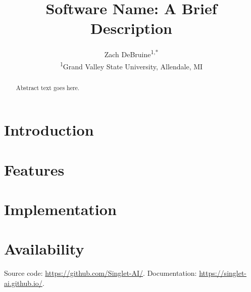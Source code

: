 \documentclass[10pt,twocolumn,letterpaper]{article}
\title{Software Name: A Brief Description}
\author{
  Zach DeBruine\textsuperscript{1,*}
  \\[6pt]
  \textsuperscript{1}Grand Valley State University, Allendale, MI
}
\begin{document}
\maketitle
{}

\begin{abstract}
  Abstract text goes here.
\end{abstract}


\section{Introduction}

\section{Features}

\section{Implementation}

\section{Availability}
Source code: \url{https://github.com/Singlet-AI/}.
Documentation: \url{https://singlet-ai.github.io/}.


\end{document}
